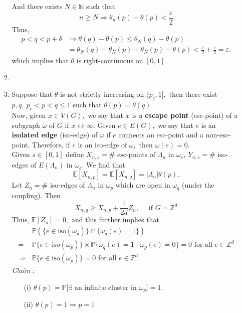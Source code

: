 \documentclass[12pt,a4paper]{report}
\theoremstyle{definition}
\begin{document}
\begin{enumerate}
\begin{enumerate}
\[	    \]
	    And there exists $N\in \mathbb{N}$ such that 
	    \[
	    n\geq N\Rightarrow \theta_n(p)-\theta(p)< \frac{\varepsilon}{2}
	    \]
	    Thus,
	    \begin{align*}
	    p<q<p+\delta&\Rightarrow \theta(q)-\theta(p)\leq \theta_N(q)-\theta(p)\\
	    &=\theta_N(q)-\theta_N(p)+\theta_N(p)-\theta(p)<\frac{\varepsilon}{2}+\frac{\varepsilon}{2}=\varepsilon.	        
	    \end{align*}
	    which implies that $\theta$ is right-continuous on $[0,1].$
	    \item  
	    \item Suppose that $\theta$ is not strictly increasing on $(p_c,1],$ then there exist $ p,q,\ p_c<p<q\leq 1$ such that $\theta(p)=\theta(q).$\\
	    Now, given $x\in V(G),$ we say that $x$ is a \textbf{escape point} (esc-point) of a subgraph $\omega$ of $G$ if $x\leftrightarrow\infty.$ Given $e\in E(G),$ we say that $e$ is an \textbf{isolated edge} (iso-edge) of $\omega$ if $e$ connects an esc-point and a non-esc-point. Therefore, if $e$ is an iso-edge of $\omega,$ then $\omega(e)=0.$\\
	    Given $s\in [0,1]$ define $X_{n,s}=\#$ esc-points of $\Lambda_n$ in $\omega_s,\ Y_{n,s}=\#$ iso-edges of $E(\Lambda_n)$ in $\omega_s.$ We find that
	    \[
	    \mathbb{E}[X_{n,p}]=\mathbb{E}[X_{n,q}]=|\Lambda_n|\theta(p).
	    \]
	    Let $Z_n=\#$ iso-edges of $\Lambda_n$ in $\omega_p$ which are open in $\omega_q$ (under the coupling). Then
	    \[
	    X_{n,q}\geq X_{n,p}+\frac{1}{2d}Z_n,\quad \mbox{ if } G=\mathbb{Z}^d
	    \]
	    Thus, $\mathbb{E}[Z_n]=0,$ and this further implies that
	    \begin{align*}
	    &\mathbb{P}(\{e\in \mathrm{iso}(\omega_p)\}\cap \{\omega_q(e)=1\})\\
	    =\,&\mathbb{P}\{e\in\mathrm{iso}(\omega_p)\}\times \mathbb{P}\{\omega_q(e)=1\mid \omega_p(e)=0\}=0\mbox{ for all }e\in \mathbb{Z}^d\\
	    \Rightarrow\, & \mathbb{P}\{e\in\mathrm{iso}(\omega_p)\}=0\mbox{ for all }e\in\mathbb{Z}^d.
	    \end{align*}
	    \textit{Claim} : 
	    \begin{enumerate}
	        \item[(i)] $\theta(p)=\mathbb{P}[\exists$ an infinite cluster in $\omega_p]=1.$
	        \item[(ii)] $\theta(p)=1\Rightarrow p=1$
	    \end{enumerate} 

\end{enumerate}
\end{enumerate}
\end{document}
